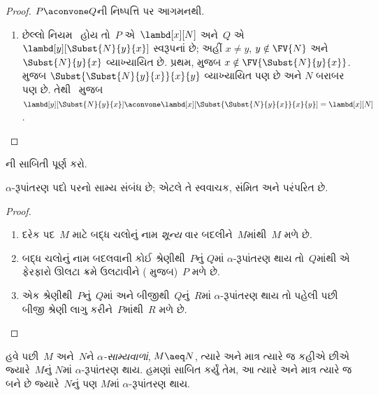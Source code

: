 \begin{proof}
  $P \aconvone Q$ની નિષ્પત્તિ પર આગમનથી.
  \begin{enumerate}
  \item છેલ્લો નિયમ~ હોય તો~$P$
    એ~$\lambd[x][N]$ અને~$Q$ એ
    $\lambd[y][\Subst{N}{y}{x}]$ સ્વરૂપનાં છે; અહીં
    $x \neq y$, $y \notin \FV{N}$ અને~$\Subst{N}{y}{x}$
    વ્યાખ્યાયિત છે. પ્રથમ,  મુજબ
    $x \notin
    \FV{\Subst{N}{y}{x}}$.  મુજબ
    $\Subst{\Subst{N}{y}{x}}{x}{y}$ વ્યાખ્યાયિત પણ છે અને
    $N$ બરાબર પણ છે. તેથી~ મુજબ
    $\lambd[y][\Subst{N}{y}{x}]
    \aconvone \lambd[x][\Subst{\Subst{N}{y}{x}}{x}{y}] =
    \lambd[x][N]$.
  \end{enumerate}
\end{proof}

\begin{prob}
  ની સાબિતી પૂર્ણ કરો.
\end{prob}

\begin{thm}
  $\alpha$-રૂપાંતરણ પદો પરનો સામ્ય સંબંધ છે; એટલે તે
  સ્વવાચક, સંમિત અને પરંપરિત છે.
\end{thm}

\begin{proof}
  \begin{enumerate}
  \item દરેક પદ~$M$ માટે બદ્ધ ચલોનું નામ \emph{શૂન્ય} વાર
    બદલીને~$M$માંથી~$M$ મળે છે.
  \item બદ્ધ ચલોનું નામ બદલવાની કોઈ શ્રેણીથી~$P$નું
    $Q$માં $\alpha$-રૂપાંતરણ થાય તો~$Q$માંથી એ ફેરફારો
    ઊલટા ક્રમે ઉલટાવીને ( મુજબ)~$P$ મળે છે.
  \item એક શ્રેણીથી~$P$નું~$Q$માં અને બીજીથી~$Q$નું~$R$માં
    $\alpha$-રૂપાંતરણ થાય તો પહેલી પછી બીજી શ્રેણી
    લાગુ કરીને~$P$માંથી~$R$ મળે છે.
  \end{enumerate}
\end{proof}

હવે પછી~$M$ અને~$N$ને \emph{$\alpha$-સામ્યવાળાં},
$M
\aeq N$, ત્યારે અને માત્ર ત્યારે જ કહીએ છીએ જ્યારે~$M$નું
$N$માં $\alpha$-રૂપાંતરણ થાય. હમણાં સાબિત કર્યું તેમ,
આ ત્યારે અને માત્ર ત્યારે જ બને છે જ્યારે~$N$નું પણ
$M$માં $\alpha$-રૂપાંતરણ થાય.

